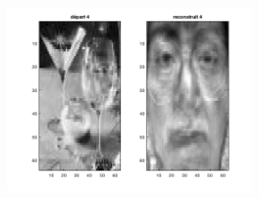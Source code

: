 \documentclass[a4paper]{article}
\begin{document}
\begin{figure}[H]
\begin{subfigure}[c]{0.24\textwidth}
    \end{subfigure}    
    \begin{subfigure}[c]{0.24\textwidth}
        \centering
        \includegraphics[width=0.8\textwidth]{images/ex5_noface4.png}
    \end{subfigure}    


\end{figure}
\end{document}
